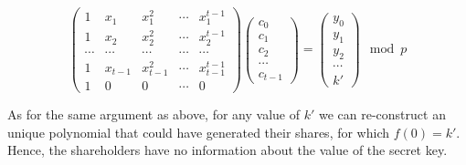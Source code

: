 \begin{equation}
  \begin{pmatrix}
    1      & x_1    & x_1^2    & \cdots & x_1^{t-1} \\
    1      & x_2    & x_2^2    & \cdots & x_2^{t-1} \\
    \cdots & \cdots & \cdots  & \cdots & \cdots \\
    1      & x_{t-1} & x_{t-1}^2 & \cdots & x_{t-1}^{t-1} \\
    1      & 0      & 0       & \cdots & 0
  \end{pmatrix}
  \begin{pmatrix}
    c_0 \\
    c_1 \\
    c_2 \\
    \cdots \\
    c_{t-1}
  \end{pmatrix} =
  \begin{pmatrix}
    y_0 \\
    y_1 \\
    y_2 \\
    \cdots \\
    k'
  \end{pmatrix} \mod p
\end{equation}

As for the same argument as above, for any value of $k'$ we can
re-construct an unique polynomial that could have generated their
shares, for which $f(0) = k'$. Hence, the shareholders have no
information about the value of the secret key.